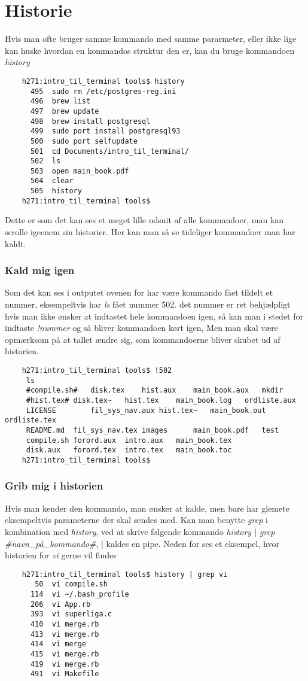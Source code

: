 \chapter{Historie}
Hvis man ofte bruger samme kommando med samme pararmeter, eller ikke lige kan huske hvordan en kommandos struktur den er, kan du bruge kommandoen \textit{history}
\begin{lstlisting}
	h271:intro_til_terminal tools$ history
	  495  sudo rm /etc/postgres-reg.ini
	  496  brew list
	  497  brew update
	  498  brew install postgresql
	  499  sudo port install postgresql93
	  500  sudo port selfupdate
	  501  cd Documents/intro_til_terminal/
	  502  ls
	  503  open main_book.pdf 
	  504  clear
	  505  history
	h271:intro_til_terminal tools$ 
\end{lstlisting}
Dette er som det kan ses et meget lille udsnit af alle kommandoer, man kan scrolle igeenem sin historier. Her kan man så se tideliger kommandoer man har kaldt. 
\subsection*{Kald mig igen}
Som det kan ses i outputet ovenen for har være kommando fået tildelt et nummer, eksempeltvis har \textit{ls} fået nummer 502. det nummer er ret behjælpligt hvis man ikke ønsker at indtastet hele kommandoen igen, så kan man i stedet for indtaste \textit{!nummer} og så bliver kommandoen kørt igen, Men man skal være opmærksom på at tallet ændre sig, som kommandoerne bliver skubet ud af historien. 
\begin{lstlisting}
	h271:intro_til_terminal tools$ !502
	 ls
	 #compile.sh#	disk.tex	hist.aux	main_book.aux	mkdir
	 #hist.tex#	disk.tex~	hist.tex	main_book.log	ordliste.aux
	 LICENSE		fil_sys_nav.aux	hist.tex~	main_book.out	ordliste.tex
	 README.md	fil_sys_nav.tex	images		main_book.pdf	test
	 compile.sh	forord.aux	intro.aux	main_book.tex
	 disk.aux	forord.tex	intro.tex	main_book.toc
	h271:intro_til_terminal tools$ 
\end{lstlisting}
\subsection*{Grib mig i historien}
Hvis man kender den kommando, man ønsker at kalde, men bare har glemete eksempeltvis parameterne der skal sendes med. Kan man benytte \textit{grep} i kombination med \textit{history}, ved at skrive følgende kommando \textit{history $\mid$ grep \#navn\_på\_kommando\#}, \textit{$\mid$} kaldes en pipe. Neden for ses et eksempel, hvor historien for \textit{vi} gerne vil findes
\begin{lstlisting}
	h271:intro_til_terminal tools$ history | grep vi
	   50  vi compile.sh
	  114  vi ~/.bash_profile
	  206  vi App.rb 
	  393  vi superliga.c 
	  410  vi merge.rb 
	  413  vi merge.rb 
	  414  vi merge
	  415  vi merge.rb 
	  419  vi merge.rb 
	  491  vi Makefile 
\end{lstlisting}
